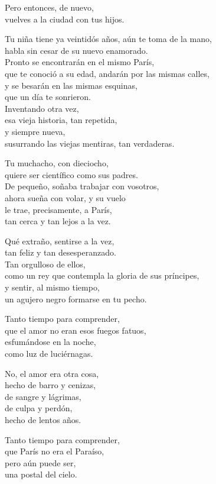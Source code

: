 \documentclass[12pt,twoside]{article}
\begin{document}
\begin{poem}
\begin{stanza}
Pero entonces, de nuevo,\\
vuelves a la ciudad con tus hijos.
\end{stanza}
\begin{stanza}
Tu niña tiene ya veintidós años, aún te toma de la mano,\\
habla sin cesar de su nuevo enamorado.\\
Pronto se encontrarán en el mismo París,\\
que te conoció a su edad, andarán por las mismas calles,\\
y se besarán en las mismas esquinas,\\
que un día te sonrieron.\\
Inventando otra vez,\\
esa vieja historia, tan repetida,\\
y siempre nueva,\\
susurrando las viejas mentiras, tan verdaderas.
\end{stanza}
\begin{stanza}
Tu muchacho, con dieciocho,\\
quiere ser científico como sus padres.\\
De pequeño, soñaba trabajar con vosotros,\\
ahora sueña con volar, y su vuelo\\
le trae, precisamente, a París,\\
tan cerca y tan lejos a la vez.
\end{stanza}
\begin{stanza}
Qué extraño, sentirse a la vez,\\
tan feliz y tan desesperanzado.\\
Tan orgulloso de ellos,\\
como un rey que contempla la gloria de sus príncipes,\\
y sentir, al mismo tiempo,\\
un agujero negro formarse en tu pecho.
\end{stanza}
\begin{stanza}
Tanto tiempo para comprender,\\
que el amor no eran esos fuegos fatuos,\\
esfumándose en la noche,\\
como luz de luciérnagas.
\end{stanza}
\begin{stanza}
No, el amor era otra cosa,\\
hecho de barro y cenizas,\\
de sangre y lágrimas,\\
de culpa y perdón,\\
hecho de lentos años.
\end{stanza}
\begin{stanza}
Tanto tiempo para comprender,\\
que París no era el Paraíso,\\
pero aún puede ser,\\
una postal del cielo.
\end{stanza}
\end{poem}
\end{document}
